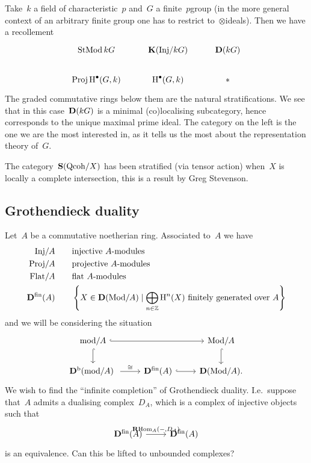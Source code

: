 \documentclass[10pt,a4paper]{article}
\begin{document}
\begin{example}
  Take~$k$ a field of characteristic~$p$ and~$G$ a finite~$p$\dash group (in the more general context of an arbitrary finite group one has to restrict to~$\otimes$\dash ideals). Then we have a recollement
  \begin{equation}
    \begin{tikzcd}
      \StMod kG & \KKK(\Inj/kG) & \derived(kG) \\
      \Proj\HH^\bullet(G,k) & \HH^\bullet(G,k) & *
    \end{tikzcd}
  \end{equation}
  The graded commutative rings below them are the natural stratifications. We see that in this case~$\mathbf{D}(kG)$ is a minimal (co)localising subcategory, hence corresponds to the unique maximal prime ideal. The category on the left is the one we are the most interested in, as it tells us the most about the representation theory of~$G$.
\end{example}

\begin{example}
  The category~$\operatorname{\mathbf{S}}(\mathrm{Qcoh}/X)$ has been stratified (via tensor action) when~$X$ is locally a complete intersection, this is a result by Greg Stevenson.
\end{example}

\subsection{Grothendieck duality}
Let~$A$ be a commutative noetherian ring. Associated to~$A$ we have
\begin{equation}
  \begin{aligned}
    \Inj/A & \qquad\text{injective $A$-modules} \\
    \mathrm{Proj}/A & \qquad\text{projective $A$-modules} \\
    \Flat/A & \qquad\text{flat $A$-modules} \\
    \derived^\fin(A) & \qquad\left\{ X\in\derived(\Mod/A)\mid\bigoplus_{n\in\mathbb{Z}}\HH^n(X)\text{ finitely generated over $A$} \right\}
  \end{aligned}
\end{equation}
and we will be considering the situation
\begin{equation}
  \begin{tikzcd}
    \mathrm{mod}/A \arrow[hook]{d} \arrow[hook]{rr} & & \Mod/A \arrow[hook]{d} \\
    \derived^\bounded(\mathrm{mod}/A) \arrow{r}{\cong} & \derived^\fin(A) \arrow[hook]{r} & \derived(\Mod/A).
  \end{tikzcd}
\end{equation}
We wish to find the ``infinite completion'' of Grothendieck duality. I.e.\ suppose that~$A$ admits a dualising complex~$D_A$, which is a complex of injective objects such that
\begin{equation}
  \begin{tikzcd}
    \derived^\fin(A) \arrow{r}{\RRRHom_A(-,D_A)} & \derived^\fin(A)
  \end{tikzcd}
\end{equation}
is an equivalence. Can this be lifted to unbounded complexes?
\end{document}
